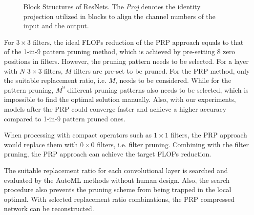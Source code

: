 \documentclass[journal,article,submit,pdftex,moreauthors]{Definitions/mdpi}
\begin{document}
\begin{figure} [t]
  \centering
  \caption{Block Structures of ResNets. The \textit{Proj} denotes the identity projection utilized in blocks to align the channel numbers of the input and the output.}
  \label{fig:ResNets}
\end{figure} 

For $3\times 3$ filters, the ideal FLOPs reduction of the PRP approach equals to that of the 1-in-9 pattern pruning method, which is achieved by pre-setting 8 zero positions in filters. However, the pruning pattern needs to be selected. For a layer with $N$ $3\times 3$ filters, $M$ filters are pre-set to be pruned. For the PRP method, only the suitable replacement ratio, i.e. $M$, needs to be considered. While for the pattern pruning, $M^9$ different pruning patterns also needs to be selected, which is impossible to find the optimal solution manually. Also, with our experiments, models after the PRP could converge faster and achieve a higher accuracy compared to 1-in-9 pattern pruned ones. 

When processing with compact operators such as $1\times 1$ filters, the PRP approach would replace them with $0\times 0$ filters, i.e. filter pruning. Combining with the filter pruning, the PRP approach can achieve the target FLOPs reduction.

The suitable replacement ratio for each convolutional layer is searched and evaluated by the AutoML methods without human design. Also, the search procedure also prevents the pruning scheme from being trapped in the local optimal. With selected replacement ratio combinations, the PRP compressed network can be reconstructed.
\end{document}
